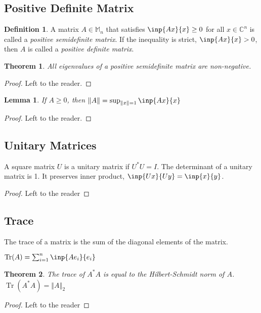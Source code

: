 \documentclass[twofold]{article}
\newcommand*\adj[1]{#1^*}
\newcommand*\norm[1]{\left \Vert #1 \right\Vert}
\DeclareMathOperator{\Tr}{Tr}
\theoremstyle{plain}
\newtheorem{theorem}{Theorem}
\newtheorem*{lemma}{Lemma}
\theoremstyle{definition}
\newtheorem*{definition}{Definition}
\begin{document}
\subsection{Positive Definite Matrix}

\begin{definition} A matrix \(A\in \mathbb{M}_n\) that satisfies \(\inp{Ax}{x} \ge 0\) for all \(x \in \mathbb{C}^n\) is called a {\em positive semidefinite matrix}. If the inequality is strict, \(\inp{Ax}{x} > 0\), then \(A\) is called a {\em positive definite matrix}.  \end{definition}

\begin{theorem}All eigenvalues of a  positive semidefinite matrix are non-negative. \end{theorem}
\begin{proof} Left to the reader. \end{proof}


\begin{lemma} If \(A \ge 0\), then \(\norm{A} = \sup _{\norm{x} = 1} \inp{Ax}{x}\) \end{lemma}
\begin{proof} Left to the reader. \end{proof}


\subsection{Unitary Matrices}

A square matrix \(U\) is a unitary matrix if \(\adj{U} U = I\). The determinant of a unitary matrix is 1. It preserves inner product, \(\inp{Ux}{Uy} = \inp{x}{y}\).

\begin{proof} Left to the reader \end{proof}

\subsection{Trace}
The trace of a matrix is the sum of the diagonal elements of the matrix. 

\(\Tr(A) = \sum_{i=1} ^n \inp{Ae_i}{ e_i}\)

\begin{theorem}The trace of \(\adj{A}A\) is equal to the Hilbert-Schmidt norm of \(A\). \(\Tr( \adj{A} A ) = \norm{A}_2\)\end{theorem}
\begin{proof} Left to the reader \end{proof}
\end{document}
